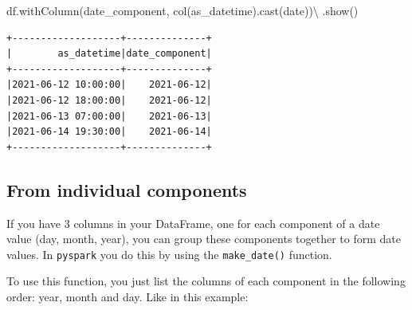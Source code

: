 \documentclass[
  11pt,
  letterpaper,
  DIV=11,
  numbers=noendperiod]{scrreprt}
\newenvironment{Shaded}{\begin{snugshade}}{\end{snugshade}}
\newcommand{\NormalTok}[1]{\textcolor[rgb]{0.00,0.23,0.31}{#1}}
\newcommand{\OperatorTok}[1]{\textcolor[rgb]{0.37,0.37,0.37}{#1}}
\newcommand{\StringTok}[1]{\textcolor[rgb]{0.13,0.47,0.30}{#1}}
\begin{document}
\begin{Shaded}
\begin{Highlighting}[]
\NormalTok{df.withColumn(}\StringTok{\textquotesingle{}date\_component\textquotesingle{}}\NormalTok{, col(}\StringTok{\textquotesingle{}as\_datetime\textquotesingle{}}\NormalTok{).cast(}\StringTok{\textquotesingle{}date\textquotesingle{}}\NormalTok{))}\OperatorTok{\textbackslash{}}
\NormalTok{    .show()}
\end{Highlighting}
\end{Shaded}

\begin{verbatim}
+-------------------+--------------+
|        as_datetime|date_component|
+-------------------+--------------+
|2021-06-12 10:00:00|    2021-06-12|
|2021-06-12 18:00:00|    2021-06-12|
|2021-06-13 07:00:00|    2021-06-13|
|2021-06-14 19:30:00|    2021-06-14|
+-------------------+--------------+
\end{verbatim}

\subsection{From individual
components}\label{from-individual-components}

If you have 3 columns in your DataFrame, one for each component of a
date value (day, month, year), you can group these components together
to form date values. In \texttt{pyspark} you do this by using the
\texttt{make\_date()} function.

To use this function, you just list the columns of each component in the
following order: year, month and day. Like in this example:
\end{document}

